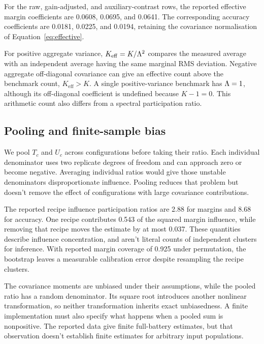 For the raw, gain-adjusted, and auxiliary-contrast rows, the reported effective margin coefficients are 0.0608, 0.0695, and 0.0641. The corresponding accuracy coefficients are 0.0181, 0.0225, and 0.0194, retaining the covariance normalisation of Equation~\ref{eq:effective}.

For positive aggregate variance, $K_{\mathrm{eff}}=K/\Lambda^2$ compares the measured average with an independent average having the same marginal RMS deviation. Negative aggregate off-diagonal covariance can give an effective count above the benchmark count, $K_{\mathrm{eff}}>K$. A single positive-variance benchmark has $\Lambda=1$, although its off-diagonal coefficient is undefined because $K-1=0$. This arithmetic count also differs from a spectral participation ratio.

\subsection{Pooling and finite-sample bias}
We pool $T_c$ and $U_c$ across configurations before taking their ratio. Each individual denominator uses two replicate degrees of freedom and can approach zero or become negative. Averaging individual ratios would give those unstable denominators disproportionate influence. Pooling reduces that problem but doesn't remove the effect of configurations with large covariance contributions.

The reported recipe influence participation ratios are 2.88 for margins and 8.68 for accuracy. One recipe contributes 0.543 of the squared margin influence, while removing that recipe moves the estimate by at most 0.037. These quantities describe influence concentration, and aren't literal counts of independent clusters for inference. With reported margin coverage of 0.925 under permutation, the bootstrap leaves a measurable calibration error despite resampling the recipe clusters.

The covariance moments are unbiased under their assumptions, while the pooled ratio has a random denominator. Its square root introduces another nonlinear transformation, so neither transformation inherits exact unbiasedness. A finite implementation must also specify what happens when a pooled sum is nonpositive. The reported data give finite full-battery estimates, but that observation doesn't establish finite estimates for arbitrary input populations.

